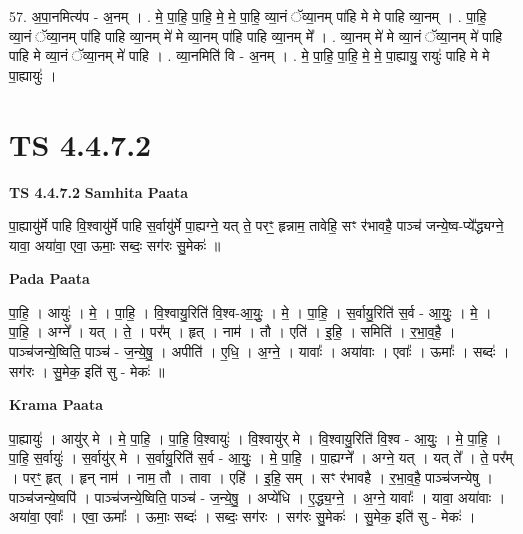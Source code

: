 \documentclass[17pt]{extarticle}
\begin{document}
57. अ॒पा॒नमित्य॑प - अ॒नम् । . मे॒ पा॒हि॒ पा॒हि॒ मे॒ मे॒ पा॒हि॒ व्या॒नं ॅव्या॒नम् पा॑हि मे मे पाहि व्या॒नम् । . पा॒हि॒ व्या॒नं ॅव्या॒नम् पा॑हि पाहि व्या॒नम् मे॑ मे व्या॒नम् पा॑हि पाहि व्या॒नम् मे᳚ । . व्या॒नम् मे॑ मे व्या॒नं ॅव्या॒नम् मे॑ पाहि पाहि मे व्या॒नं ॅव्या॒नम् मे॑ पाहि । . व्या॒नमिति॑ वि - अ॒नम् । . मे॒ पा॒हि॒ पा॒हि॒ मे॒ मे॒ पा॒ह्यायु॒ रायुः॑ पाहि मे मे पा॒ह्यायुः॑ । \newline
\pagebreak
{}

\section{ TS 4.4.7.2 }

\textbf{TS 4.4.7.2 } \newline
\textbf{Samhita Paata} \newline

पा॒ह्यायु॑र्मे पाहि वि॒श्वायु॑र्मे पाहि स॒र्वायु॑र्मे पा॒ह्यग्ने॒ यत् ते॒ परꣳ॒॒ हृन्नाम॒ तावेहि॒ सꣳ र॑भावहै॒ पाञ्च॑ जन्ये॒ष्व-प्ये᳚द्ध्यग्ने॒ यावा॒ अया॑वा॒ एवा॒ ऊमाः॒ सब्दः॒ सग॑रः सु॒मेकः॑ ॥ \newline

\textbf{Pada Paata} \newline

पा॒हि॒ । आयुः॑ । मे॒ । पा॒हि॒ । वि॒श्वायु॒रिति॑ वि॒श्व-आ॒युः॒ । मे॒ । पा॒हि॒ । स॒र्वायु॒रिति॑ स॒र्व - आ॒युः॒ । मे॒ । पा॒हि॒ । अग्ने᳚ । यत् । ते॒ । पर᳚म् । हृत् । नाम॑ । तौ । एति॑ । इ॒हि॒ । समिति॑ । र॒भा॒व॒है॒ । पाञ्च॑जन्ये॒ष्विति॒ पाञ्च॑ - ज॒न्ये॒षु॒ । अपीति॑ । ए॒धि॒ । अ॒ग्ने॒ । यावाः᳚ । अया॑वाः । एवाः᳚ । ऊमाः᳚ । सब्दः॑ । सग॑रः । सु॒मेक॒ इति॑ सु - मेकः॑ ॥  \newline


\textbf{Krama Paata} \newline

पा॒ह्यायुः॑ । आयु॑र् मे । मे॒ पा॒हि॒ । पा॒हि॒ वि॒श्वायुः॑ । वि॒श्वायु॑र् मे । वि॒श्वायु॒रिति॑ वि॒श्व - आ॒युः॒ । मे॒ पा॒हि॒ । पा॒हि॒ स॒र्वायुः॑ । स॒र्वायु॑र् मे । स॒र्वायु॒रिति॑ स॒र्व - आ॒युः॒ । मे॒ पा॒हि॒ । पा॒ह्यग्ने᳚ । अग्ने॒ यत् । यत् ते᳚ । ते॒ पर᳚म् । परꣳ॒॒ हृत् । हृन् नाम॑ । नाम॒ तौ । तावा । एहि॑ । इ॒हि॒ सम् । सꣳ र॑भावहै । र॒भा॒व॒है॒ पाञ्च॑जन्येषु । पाञ्च॑जन्ये॒ष्वपि॑ । पाञ्च॑जन्ये॒ष्विति॒ पाञ्च॑ - ज॒न्ये॒षु॒ । अप्ये॑धि । ए॒द्ध्य॒ग्ने॒ । अ॒ग्ने॒ यावाः᳚ । यावा॒ अया॑वाः । अया॑वा॒ एवाः᳚ । एवा॒ ऊमाः᳚ । ऊमाः॒ सब्दः॑ । सब्दः॒ सग॑रः । सग॑रः सु॒मेकः॑ । सु॒मेक॒ इति॑ सु - मेकः॑ । \newline
\end{document}
